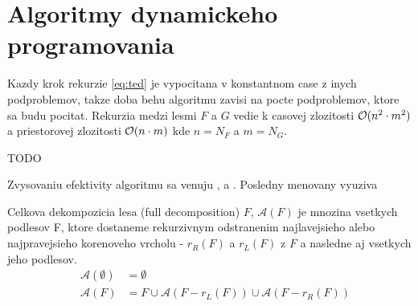 \section{Algoritmy dynamickeho programovania}

Kazdy krok rekurzie \ref{eq:ted} je vypocitana v konstantnom case z inych podproblemov,
takze doba behu algoritmu zavisi na pocte podproblemov, ktore sa budu pocitat.
Rekurzia medzi lesmi $F$ a $G$ vedie k casovej zlozitosti $\mathcal{O}(n^2 \cdot m^2)$
a priestorovej zlozitosti $\mathcal{O}(n \cdot m)$ kde $n = N_F$ a $m = N_G$.

\begin{definice}
	TODO
\end{definice}

Zvysovaniu efektivity algoritmu sa venuju \citet{ZHANGSHASHA}, \citet{DMRW} a \citet{RTED}.
Posledny menovany vyuziva 

\begin{definice}
	Celkova dekompozicia lesa (full decomposition) $F$, $\mathcal{A}(F)$ je mnozina
	vsetkych podlesov F, ktore dostaneme rekurzivnym odstranenim najlavejsieho
	alebo najpravejsieho korenoveho vrcholu - $r_{R}(F)$ a $r_{L}(F)$ z $F$
	a nasledne aj vsetkych jeho podlesov.
	\begin{align*}
		\quad{} \mathcal{A}(\emptyset) &= \emptyset
		\\
		\quad{} \mathcal{A}(F) &= {F} \cup \mathcal{A}(F - r_{L}(F)) \cup \mathcal{A}(F - r_{R}(F))
	\end{align*}
\end{definice}



